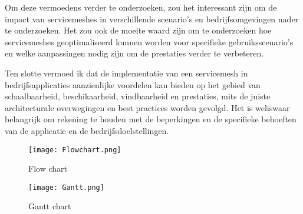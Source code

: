 Om deze vermoedens verder te onderzoeken, zou het interessant zijn om de impact van servicemeshes in verschillende scenario's en bedrijfsomgevingen nader te onderzoeken. Het zou ook de moeite waard zijn om te onderzoeken hoe servicemeshes geoptimaliseerd kunnen worden voor specifieke gebruiksscenario's en welke aanpassingen nodig zijn om de prestaties verder te verbeteren.

Ten slotte vermoed ik dat de implementatie van een servicemesh in bedrijfsapplicaties aanzienlijke voordelen kan bieden op het gebied van schaalbaarheid, beschikaarheid, vindbaarheid en prestaties, mits de juiste architecturale overwegingen en best practices worden gevolgd. Het is weliswaar belangrijk om rekening te houden met de beperkingen en de specifieke behoeften van de applicatie en de bedrijfsdoelstellingen.

\begin{figure*}[t]   
	\centering   
	\texttt{[image: Flowchart.png]}  
	\caption{Flow chart}
	\label{fig:flowchart}				 
\end{figure*} 
\begin{figure*}[t]   
	\centering   
	\texttt{[image: Gantt.png]}   
	\caption{Gantt chart}	
	\label{fig:gantt}	
\end{figure*}